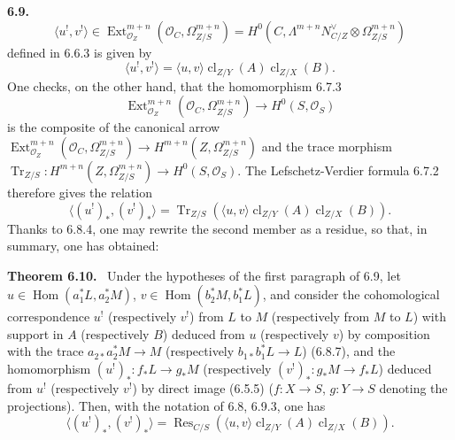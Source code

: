 \documentclass[11pt]{article}
\newenvironment{statement}[1]{\par\medskip\noindent\textbf{#1.}\ }{\par\medskip}
\DeclareMathOperator{\Hom}{Hom}
\DeclareMathOperator{\Ext}{Ext}
\providecommand{\cl}{\operatorname{cl}}
\providecommand{\Tr}{\operatorname{Tr}}
\providecommand{\OO}{\mathcal O}
\providecommand{\Res}{\operatorname{Res}}
\begin{document}
\begin{statement}{6.9}
\[
\langle u^!,v^!\rangle\in\Ext^{m+n}_{\OO_Z}(\OO_C,\Omega^{m+n}_{Z/S})=H^0(C,\Lambda^{m+n}N^\vee_{C/Z}\otimes\Omega^{m+n}_{Z/S})
\]
defined in 6.6.3 is given by
\begin{equation}
\tag{6.9.4}
\langle u^!,v^!\rangle=\langle u,v\rangle\cl_{Z/Y}(A)\cl_{Z/X}(B).
\end{equation}
One checks, on the other hand, that the homomorphism 6.7.3
\[
\Ext^{m+n}_{\OO_Z}(\OO_C,\Omega^{m+n}_{Z/S})\longrightarrow H^0(S,\OO_S)
\]
is the composite of the canonical arrow $\Ext^{m+n}_{\OO_Z}(\OO_C,\Omega^{m+n}_{Z/S})\to H^{m+n}(Z,\Omega^{m+n}_{Z/S})$ and the trace morphism $\Tr_{Z/S}:H^{m+n}(Z,\Omega^{m+n}_{Z/S})\to H^0(S,\OO_S)$. The Lefschetz-Verdier formula 6.7.2 therefore gives the relation
\begin{equation}
\tag{6.9.5}
\langle (u^!)_*,(v^!)_*\rangle=\Tr_{Z/S}(\langle u,v\rangle\cl_{Z/Y}(A)\cl_{Z/X}(B)).
\end{equation}
Thanks to 6.8.4, one may rewrite the second member as a residue, so that, in summary, one has obtained:
\end{statement}

\begin{statement}{Theorem 6.10}
Under the hypotheses of the first paragraph of 6.9, let $u\in\Hom(a_1^*L,a_2^*M)$, $v\in\Hom(b_2^*M,b_1^*L)$, and consider the cohomological correspondence $u^!$ (respectively $v^!$) from $L$ to $M$ (respectively from $M$ to $L$) with support in $A$ (respectively $B$) deduced from $u$ (respectively $v$) by composition with the trace $a_{2*}a_2^*M\to M$ (respectively $b_{1*}b_1^*L\to L$) (6.8.7), and the homomorphism $(u^!)_*:f_*L\to g_*M$ (respectively $(v^!)_*:g_*M\to f_*L$) deduced from $u^!$ (respectively $v^!$) by direct image (6.5.5) ($f:X\to S$, $g:Y\to S$ denoting the projections). Then, with the notation of 6.8, 6.9.3, one has
\begin{equation}
\tag{6.10.1}
\langle (u^!)_*,(v^!)_*\rangle=\Res_{C/S}(\langle u,v\rangle\cl_{Z/Y}(A)\cl_{Z/X}(B)).
\end{equation}
\end{statement}
\end{document}
